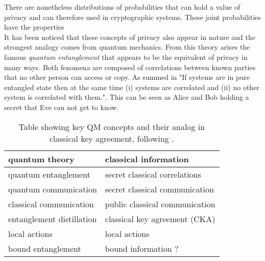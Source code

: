 

There are nonetheless distributions of probabilities that can hold a value of privacy and can therefore used in cryptographic systems. These joint probabilities have the properties
\\

It has been noticed that these concepts of privacy also appear in nature and the strongest analogy comes from quantum mechanics.\footnotemark 
From this theory arises the famous \emph{quantum entanglement} that appears to be the equivalent of privacy in many ways.
Both fenomena are composed of correlations between known parties that no other person can access or copy. As summed in \cite{4H07} "If systems are in pure entangled state then at the same time (i) systems are correlated and (ii) no other system is correlated with them.". 
This can be seen as Alice and Bob holding a secret that Eve can not get to know.
\begin{table}[h]
	 \centering
	 	\begin{tabular}{ l | l}
	 		\textbf{quantum theory} & \textbf{classical information} \\ 
	 		\hline 
	 		quantum entanglement & secret classical correlations \\ 
	 		quantum communication & secret classical communication \\ 
	 		classical communication & public classical communication \\ 
	 		entanglement distillation & classical key agreement (CKA) \\ %
	 		local actions & local actions \\ 
	 		bound entanglement & bound information ? \\
	 	\end{tabular} 
	 	\caption{Table showing key QM concepts and their analog in classical key agreement, following \cite{CP02}.
	 	\label{Tab:analogy}}
	 \end{table}
\\


